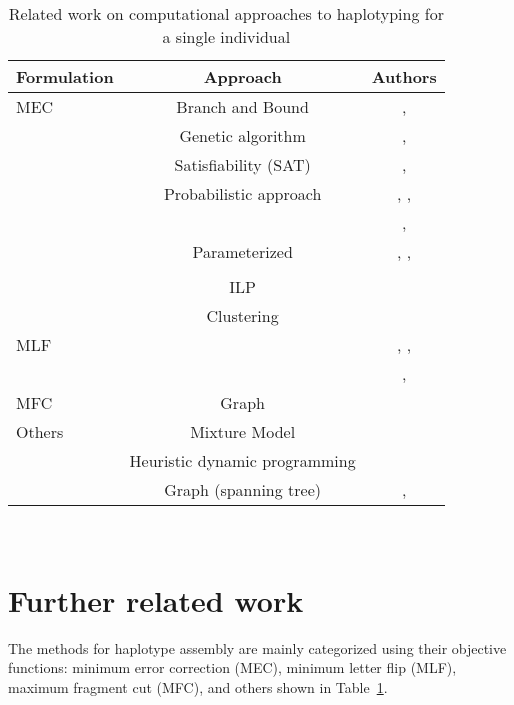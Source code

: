 \begin{center}
\begin{table}
\centering
\begin{tabular}{ |l|c|c| } 
 \hline
Formulation &  Approach  & Authors \\ 
  \hline
 MEC & Branch and Bound & \cite{wang2005haplotype}, \cite{lim2012individual}\\
   & Genetic algorithm& \cite{wang2005haplotype}, \cite{wang2012using}\\
   & Satisfiability (SAT) & \cite{mousavi2011effective}, \cite{he2010optimal} \\
   & Probabilistic approach & \cite{chen2008linear}, \cite{bansal2008mcmc}, \\
   & & \cite{Bansal2008}, \cite{Kuleshov2014b} \\
   & Parameterized & \cite{deng2013highly}, \cite{Pirola2015}, \\
   & & \cite{Patterson2015}\\
   & ILP & \cite{Chen2013} \\
   & Clustering & \cite{wang2007clustering} \\
   \hline
   MLF &  & \cite{zhao2005haplotype}, \cite{xie2008model}, \\
   & & \cite{kang2010hapassembler}, \cite{wu2013heuristic}\\
   \hline
   MFC & Graph & \cite{Duitama2010} \\
   \hline
   Others & Mixture Model & \cite{matsumoto2013mixsih} \\
    & Heuristic dynamic programming & \cite{xie2012fast} \\
    & Graph (spanning tree) & \cite{aguiar2012hapcompass}, \cite{mazrouee2014fasthap} \\
 \hline
\end{tabular}
\\[10pt]
 \caption{ Related work on computational approaches to haplotyping for a single individual}
\label{tab:related_work}
\end{table}
\end{center}
\section{Further related work}
The methods for haplotype assembly are mainly categorized using their objective functions: minimum error correction (MEC), minimum letter flip (MLF), maximum fragment cut (MFC), and others shown in Table~\ref{tab:related_work}.

